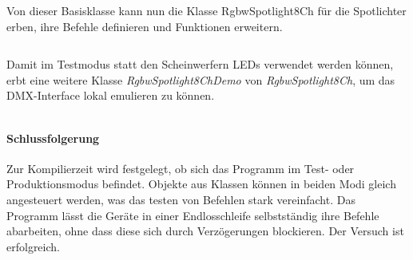 Von dieser Basisklasse kann nun die Klasse RgbwSpotlight8Ch für die Spotlichter erben, ihre Befehle definieren und Funktionen erweitern.
\inputminted[linenos=true, breaklines, fontsize=\fontsize{10pt}{10pt}]{cpp}{../src/RgbwSpotlight8Ch.h}

Damit im Testmodus statt den Scheinwerfern LEDs verwendet werden können, erbt eine weitere Klasse \textit{RgbwSpotlight8ChDemo} von \textit{RgbwSpotlight8Ch}, um das DMX-Interface lokal emulieren zu können.
\inputminted[linenos=true, breaklines, fontsize=\fontsize{10pt}{10pt}]{cpp}{../src/RgbwSpotlight8ChDemo.h}

\paragraph{Schlussfolgerung}
Zur Kompilierzeit wird festgelegt, ob sich das Programm im Test- oder Produktionsmodus befindet. Objekte aus Klassen können in beiden Modi gleich angesteuert werden, was das testen von Befehlen stark vereinfacht. Das Programm lässt die Geräte in einer Endlosschleife selbstständig ihre Befehle abarbeiten, ohne dass diese sich durch Verzögerungen blockieren. Der Versuch ist erfolgreich.
